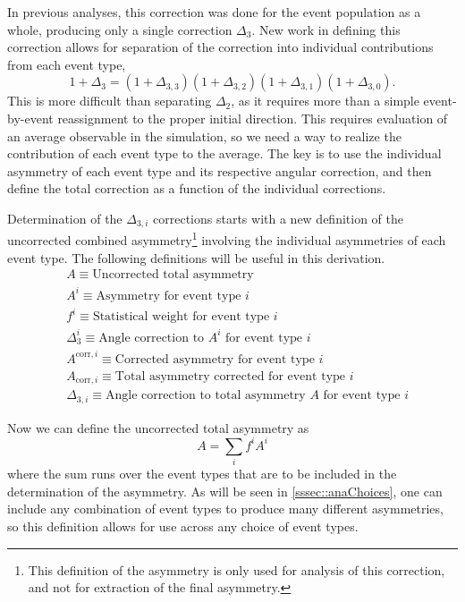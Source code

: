 In previous analyses, this correction was done for the event population as a whole, producing
only a single correction $\Delta_3$. New work in defining this correction allows for
separation of the correction into individual contributions from each event type,
%
\begin{equation}
1+\Delta_{3} = (1+\Delta_{3,3})(1+\Delta_{3,2})(1+\Delta_{3,1})(1+\Delta_{3,0}).
\end{equation}
%
\noindent This is more difficult than separating $\Delta_2$, as it requires more than a simple
event-by-event reassignment to the proper initial direction. This requires evaluation of
an average observable in the simulation, so we need a way to realize the contribution
of each event type to the average. The key is to use the individual asymmetry of each event
type and its respective angular correction, and then define the total correction as a function
of the individual corrections. 

Determination of the $\Delta_{3,i}$ corrections starts with a new definition of the
uncorrected combined asymmetry\footnote{\label{fnote:newAsymmDef}This definition
of the asymmetry is only used for analysis of this correction, and not for extraction
of the final asymmetry.} involving the individual asymmetries of each event type.
The following definitions will be useful in this derivation.
%
\begin{align*}
  &A \equiv \textrm{Uncorrected total asymmetry}\\
  &A^i \equiv \textrm{Asymmetry for event type } i\\
  &f^i \equiv \textrm{Statistical weight for event type }i\\
  &\Delta^i_3 \equiv \textrm{Angle correction to }A^i\textrm{ for event type }i\\
  &A^{\mathrm{corr},i} \equiv \textrm{Corrected asymmetry for event type } i\\
  &A_{\mathrm{corr},i} \equiv \textrm{Total asymmetry corrected for event type } i\\
  &\Delta_{3,i} \equiv \textrm{Angle correction to total asymmetry }A
  \textrm{ for event type }i
\end{align*}
%

Now we can define the uncorrected total asymmetry as
%
\begin{equation}
A=\sum_i f^iA^i
\end{equation}
%
\noindent where the sum runs over the event types that are to be included in the
determination of the asymmetry. As will be seen in \ref{sssec::anaChoices}, one can include
any combination of event types to produce many different asymmetries, so this definition
allows for use across any choice of event types.

